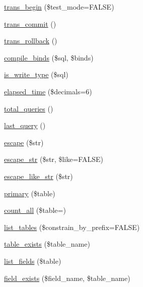 \begin{DoxyCompactItemize}
\item 
\mbox{\hyperlink{class_c_i___d_b__driver_a90e153cf190d273336d77cce930587e1}{trans\+\_\+begin}} (\$test\+\_\+mode=F\+A\+L\+SE)
\item 
\mbox{\hyperlink{class_c_i___d_b__driver_af4fbdcdace4aa94a139b64877601fe9b}{trans\+\_\+commit}} ()
\item 
\mbox{\hyperlink{class_c_i___d_b__driver_a53f76d4dfcd6ac04fb653982442aeef8}{trans\+\_\+rollback}} ()
\item 
\mbox{\hyperlink{class_c_i___d_b__driver_a0ba381d2e9078472bd0167e75cc8033c}{compile\+\_\+binds}} (\$sql, \$binds)
\item 
\mbox{\hyperlink{class_c_i___d_b__driver_af435df5703c238769d6d16fde6d51182}{is\+\_\+write\+\_\+type}} (\$sql)
\item 
\mbox{\hyperlink{class_c_i___d_b__driver_a7bcec8d3f7d72453deb78e296815711a}{elapsed\+\_\+time}} (\$decimals=6)
\item 
\mbox{\hyperlink{class_c_i___d_b__driver_a8fc0b6551e1ca0c68c6e3a66b27310fc}{total\+\_\+queries}} ()
\item 
\mbox{\hyperlink{class_c_i___d_b__driver_a8117354f1fa0b2873f0ad2792dc21389}{last\+\_\+query}} ()
\item 
\mbox{\hyperlink{class_c_i___d_b__driver_ac8f37ca5703d4558c732e692194f8cd6}{escape}} (\$str)
\item 
\mbox{\hyperlink{class_c_i___d_b__driver_aaba16891c8c93600a87075800cc5b72b}{escape\+\_\+str}} (\$str, \$like=F\+A\+L\+SE)
\item 
\mbox{\hyperlink{class_c_i___d_b__driver_a1a15f371afab8d5cfb35e38fc53c620f}{escape\+\_\+like\+\_\+str}} (\$str)
\item 
\mbox{\hyperlink{class_c_i___d_b__driver_a68e5f4a4a6fdb79a9a403b045c59b618}{primary}} (\$table)
\item 
\mbox{\hyperlink{class_c_i___d_b__driver_a7f59c2dc2e3226fe49f35f8c49e8fc94}{count\+\_\+all}} (\$table=\textquotesingle{}\textquotesingle{})
\item 
\mbox{\hyperlink{class_c_i___d_b__driver_accef90659bed312aba1c3df80620b402}{list\+\_\+tables}} (\$constrain\+\_\+by\+\_\+prefix=F\+A\+L\+SE)
\item 
\mbox{\hyperlink{class_c_i___d_b__driver_af148cb2cd5d490d2a480c0c741ceed03}{table\+\_\+exists}} (\$table\+\_\+name)
\item 
\mbox{\hyperlink{class_c_i___d_b__driver_aef08cd376b16b24608100ca0e3f2f85b}{list\+\_\+fields}} (\$table)
\item 
\mbox{\hyperlink{class_c_i___d_b__driver_ad349ffee1eed59a2eb8f0f1d3033764f}{field\+\_\+exists}} (\$field\+\_\+name, \$table\+\_\+name)

\end{DoxyCompactItemize}
